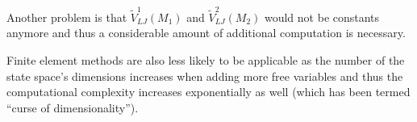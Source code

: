 Another problem is that $\tilde V_{LJ}^1(M_1)$ and $\tilde V_{LJ}^2(M_2)$ would not be constants anymore and thus a considerable amount of additional computation is necessary.

Finite element methods are also less likely to be applicable as the number of the state space's dimensions increases when adding more free variables and thus the computational complexity increases exponentially as well (which has been termed ``curse of dimensionality'').





